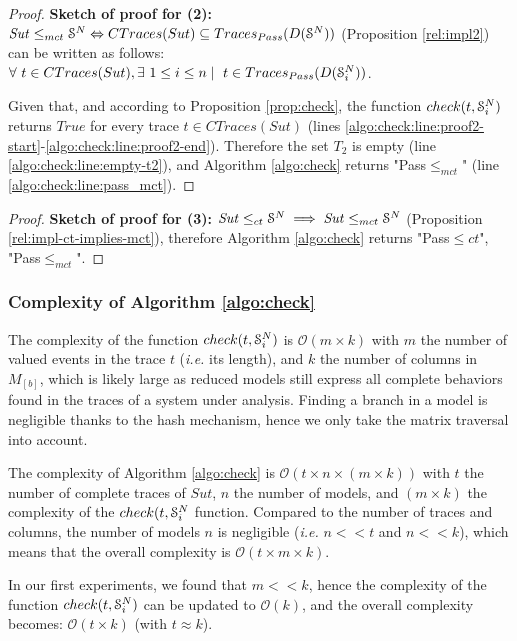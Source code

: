 \begin{proof}
    \textbf{Sketch of proof for (2):} $\mathit{Sut} \leq_{mct} \EuScript{S}^{N}
    \Leftrightarrow CTraces(Sut) \subseteq Traces_{Pass}(D(\EuScript{S}^N))$
    (Proposition \ref{rel:impl2}) can be written as
    follows: $\forall ~t \in CTraces(Sut), \exists ~1
    \leq i \leq n \mid ~t \in Traces_{Pass}(D(\EuScript{S}_i^{N}))$.

    Given that, and according to Proposition
    \ref{prop:check}, the function $check(t, \EuScript{S}_i^N)$ returns $True$ for
    every trace $t \in CTraces(Sut)$ (lines
    \ref{algo:check:line:proof2-start}-\ref{algo:check:line:proof2-end}).
    Therefore the set $T_2$ is empty
    (line \ref{algo:check:line:empty-t2}), and Algorithm
    \ref{algo:check} returns "Pass$\leq_{mct}$" (line
    \ref{algo:check:line:pass_mct}).
\end{proof}


\begin{proof}
    \textbf{Sketch of proof for (3):} $\mathit{Sut} \leq_{ct}
    \EuScript{S}^{N} \implies \mathit{Sut} \leq_{mct}
    \EuScript{S}^{N}$ (Proposition
    \ref{rel:impl-ct-implies-mct}), therefore Algorithm
    \ref{algo:check} returns "Pass$\leq{ct}$",
    "Pass$\leq_{mct}$".
\end{proof}

\subsubsection{Complexity of Algorithm \ref{algo:check}}

The complexity of the function $check(t, \EuScript{S}_i^{N})$ is
$\mathcal{O}(m \times k)$ with $m$ the number of valued events in
the trace $t$ (\emph{i.e.} its length), and $k$ the number of
columns in $M_{[b]}$, which is likely large as reduced models
still express all complete behaviors found in the traces of a
system under analysis. Finding a branch in a model is negligible
thanks to the hash mechanism, hence we only take the matrix
traversal into account.

The complexity of Algorithm \ref{algo:check} is $\mathcal{O}(t
\times n \times (m \times k))$ with $t$ the number of complete
traces of $\mathit{Sut}$, $n$ the number of models, and $(m
\times k)$ the complexity of the $check(t, \EuScript{S}_i^N$
function.  Compared to the number of traces and columns, the
number of models $n$ is negligible (\emph{i.e.} $n << t$ and $n
<< k$), which means that the overall complexity is $\mathcal{O}(t
\times m \times k)$.

In our first experiments, we found that $m << k$, hence the
complexity of the function $check(t, \EuScript{S}_i^N)$ can be
updated to $\mathcal{O}(k)$, and the overall complexity
becomes: $\mathcal{O}(t \times k)$ (with $t \approx k$).

\clearpage
